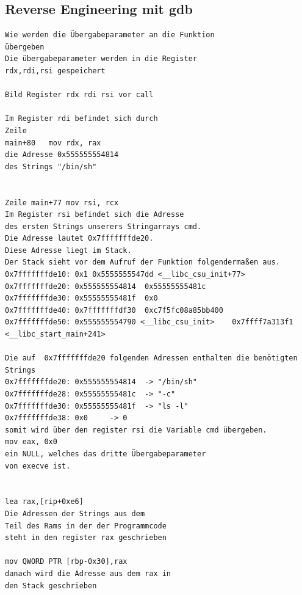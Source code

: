 \documentclass[12pt]{article}
\begin{document}
\subsection{Reverse Engineering mit gdb}
\begin{lstlisting}
Wie werden die Übergabeparameter an die Funktion
übergeben 
Die übergabeparameter werden in die Register 
rdx,rdi,rsi gespeichert

Bild Register rdx rdi rsi vor call

Im Register rdi befindet sich durch 
Zeile 
main+80   mov rdx, rax
die Adresse 0x555555554814
des Strings "/bin/sh"
 

Zeile main+77 mov rsi, rcx 
Im Register rsi befindet sich die Adresse
des ersten Strings unserers Stringarrays cmd.
Die Adresse lautet 0x7fffffffde20. 
Diese Adresse liegt im Stack. 
Der Stack sieht vor dem Aufruf der Funktion folgendermaßen aus.
0x7fffffffde10:	0x1	0x5555555547dd <__libc_csu_init+77>
0x7fffffffde20:	0x555555554814	0x55555555481c
0x7fffffffde30:	0x55555555481f	0x0
0x7fffffffde40:	0x7fffffffdf30	0xc7f5fc08a85bb400
0x7fffffffde50:	0x555555554790 <__libc_csu_init>	0x7ffff7a313f1 <__libc_start_main+241>

Die auf  0x7fffffffde20 folgenden Adressen enthalten die benötigten Strings
0x7fffffffde20: 0x555555554814  -> "/bin/sh"
0x7fffffffde28: 0x55555555481c	-> "-c"
0x7fffffffde30: 0x55555555481f	-> "ls -l"
0x7fffffffde38: 0x0		-> 0
somit wird über den register rsi die Variable cmd übergeben.
mov eax, 0x0 
ein NULL, welches das dritte Übergabeparameter 
von execve ist.


lea rax,[rip+0xe6] 
Die Adressen der Strings aus dem 
Teil des Rams in der der Programmcode 
steht in den register rax geschrieben 

mov QWORD PTR [rbp-0x30],rax
danach wird die Adresse aus dem rax in 
den Stack geschrieben


\end{lstlisting}
\end{document}
